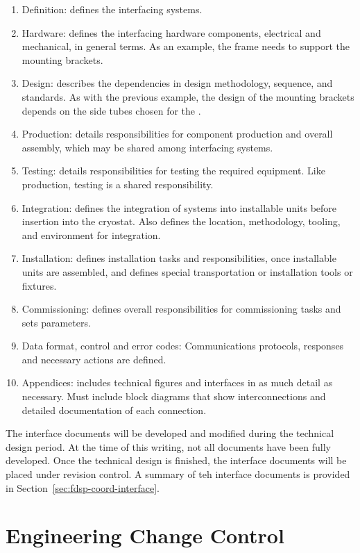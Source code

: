 \begin{enumerate}
 \item Definition: defines the interfacing systems.
 \item Hardware: defines the interfacing hardware components,
   electrical and mechanical, in general terms. As an
   example, the  frame needs to support the 
   mounting brackets.
 \item Design: describes the dependencies in design
   methodology, sequence, and standards. As with the
   previous example, the design of the  mounting
   brackets depends on the side tubes chosen for the .
 \item Production: details responsibilities for component production
   and overall assembly, which may be shared among interfacing
   systems.
 \item Testing: details responsibilities for testing the required
   equipment. Like production, testing is a shared responsibility.
 \item Integration: defines the integration of systems into installable units
   before insertion into the cryostat. 
   Also defines the location, methodology, tooling, and environment for integration.
 \item Installation: defines installation tasks and responsibilities, once
   installable units are assembled, and  defines  
   special transportation or installation tools or fixtures. 
 \item Commissioning: defines overall responsibilities for
   commissioning tasks  and sets parameters. 
 \item Data format, control and error codes: Communications protocols,
   responses and necessary actions are defined.
 \item Appendices: includes technical figures and interfaces 
   in as much detail as necessary. Must include block diagrams that
   show interconnections and detailed documentation of each connection.
\end{enumerate}


The interface documents will be developed and modified during the
technical design period. At the time of this writing, not all
documents have been fully developed. Once the technical design is
finished, the interface documents will be placed under revision
control. A summary of teh interface documents is provided in
Section~\ref{sec:fdsp-coord-interface}.

\section{Engineering Change Control}
\label{sec:fdsp-change}

